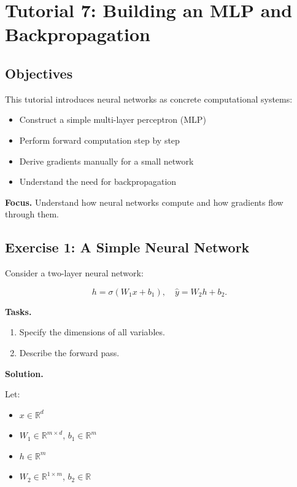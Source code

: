 \section{Tutorial 7: Building an MLP and Backpropagation}

\subsection{Objectives}

This tutorial introduces neural networks as concrete computational systems:

\begin{itemize}
    \item Construct a simple multi-layer perceptron (MLP)
    \item Perform forward computation step by step
    \item Derive gradients manually for a small network
    \item Understand the need for backpropagation
\end{itemize}

\medskip

\noindent
\textbf{Focus.}  
Understand how neural networks compute and how gradients flow through them.

\subsection{Exercise 1: A Simple Neural Network}

Consider a two-layer neural network:

\[
h = \sigma(W_1 x + b_1), \quad
\hat{y} = W_2 h + b_2.
\]

\medskip

\noindent
\textbf{Tasks.}
\begin{enumerate}
    \item Specify the dimensions of all variables.
    \item Describe the forward pass.
\end{enumerate}

\medskip

\noindent
\textbf{Solution.}

Let:
\begin{itemize}
    \item $x \in \mathbb{R}^d$
    \item $W_1 \in \mathbb{R}^{m \times d}$, $b_1 \in \mathbb{R}^m$
    \item $h \in \mathbb{R}^m$
    \item $W_2 \in \mathbb{R}^{1 \times m}$, $b_2 \in \mathbb{R}$
\end{itemize}

